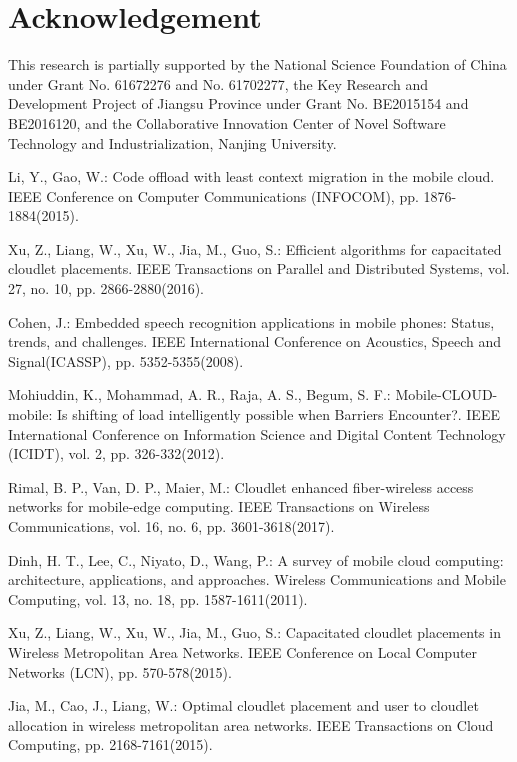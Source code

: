 \documentclass{llncs}
\begin{document}
\section*{Acknowledgement}

This research is partially supported by the National Science Foundation of China under Grant No. 61672276 and No. 61702277, the Key Research and Development Project of Jiangsu Province under Grant No. BE2015154 and BE2016120, and the Collaborative Innovation Center of Novel Software Technology and Industrialization, Nanjing University.

%
\begin{thebibliography}{99}
%
Li, Y., Gao, W.:
Code offload with least context migration in the mobile cloud.
IEEE Conference on Computer Communications (INFOCOM), pp. 1876-1884(2015).

Xu, Z., Liang, W., Xu, W., Jia, M., Guo, S.:
Efficient algorithms for capacitated cloudlet placements.
IEEE Transactions on Parallel and Distributed Systems, vol. 27, no. 10, pp. 2866-2880(2016).

Cohen, J.:
Embedded speech recognition applications in mobile phones: Status, trends, and challenges.
IEEE International Conference on Acoustics, Speech and Signal(ICASSP), pp. 5352-5355(2008).

Mohiuddin, K., Mohammad, A. R., Raja, A. S., Begum, S. F.:
Mobile-CLOUD-mobile: Is shifting of load intelligently possible when Barriers Encounter?.
IEEE International Conference on Information Science and Digital Content Technology (ICIDT), vol. 2, pp. 326-332(2012).

Rimal, B. P., Van, D. P., Maier, M.:
Cloudlet enhanced fiber-wireless access networks for mobile-edge computing.
IEEE Transactions on Wireless Communications, vol. 16, no. 6, pp. 3601-3618(2017).

Dinh, H. T., Lee, C., Niyato, D., Wang, P.:
A survey of mobile cloud computing: architecture, applications, and approaches.
Wireless Communications and Mobile Computing, vol. 13, no. 18, pp. 1587-1611(2011).

Xu, Z., Liang, W., Xu, W., Jia, M., Guo, S.:
Capacitated cloudlet placements in Wireless Metropolitan Area Networks.
IEEE Conference on Local Computer Networks (LCN), pp. 570-578(2015).

Jia, M., Cao, J., Liang, W.:
Optimal cloudlet placement and user to cloudlet allocation in wireless metropolitan area networks.
IEEE Transactions on Cloud Computing, pp. 2168-7161(2015).


\end{thebibliography}
\end{document}

